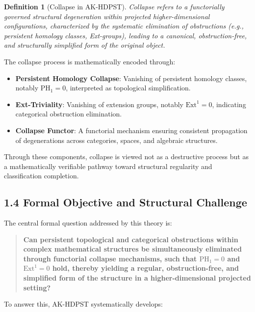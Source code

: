 \documentclass[11pt]{article}
\newtheorem{definition}[theorem]{Definition}
\begin{document}
\begin{definition}[Collapse in AK-HDPST]
Collapse refers to a functorially governed structural degeneration within projected higher-dimensional configurations,  
characterized by the systematic elimination of obstructions (e.g., persistent homology classes, Ext-groups),  
leading to a canonical, obstruction-free, and structurally simplified form of the original object.
\end{definition}

The collapse process is mathematically encoded through:

\begin{itemize}
    \item \textbf{Persistent Homology Collapse}: Vanishing of persistent homology classes, notably $\mathrm{PH}_1 = 0$, interpreted as topological simplification.
    \item \textbf{Ext-Triviality}: Vanishing of extension groups, notably $\mathrm{Ext}^1 = 0$, indicating categorical obstruction elimination.
    \item \textbf{Collapse Functor}: A functorial mechanism ensuring consistent propagation of degenerations across categories, spaces, and algebraic structures.
\end{itemize}

Through these components, collapse is viewed not as a destructive process but as a mathematically verifiable pathway toward structural regularity and classification completion.

\subsection*{1.4 Formal Objective and Structural Challenge}

The central formal question addressed by this theory is:

\begin{quote}
\textbf{Can persistent topological and categorical obstructions within complex mathematical structures be simultaneously eliminated  
through functorial collapse mechanisms, such that $\mathrm{PH}_1 = 0$ and $\mathrm{Ext}^1 = 0$ hold,  
thereby yielding a regular, obstruction-free, and simplified form of the structure in a higher-dimensional projected setting?}
\end{quote}

To answer this, AK-HDPST systematically develops:
\end{document}
